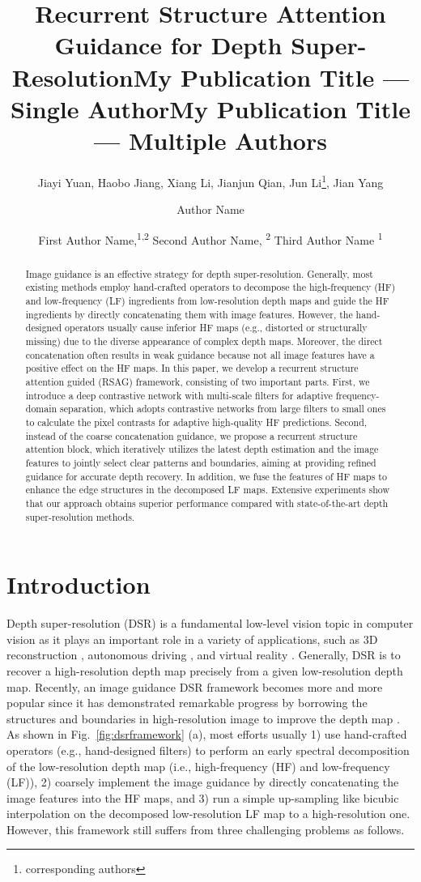 \documentclass[letterpaper]{article} %
\title{Recurrent Structure Attention Guidance for Depth Super-Resolution}
\author{
    Jiayi Yuan\equalcontrib, Haobo Jiang\equalcontrib, Xiang Li, Jianjun Qian\footnotemark[2], Jun Li\thanks{corresponding authors}, Jian Yang
}
\title{My Publication Title --- Single Author}
\author {
    Author Name
}
\title{My Publication Title --- Multiple Authors}
\author {
    First Author Name,\textsuperscript{\rm 1,\rm 2}
    Second Author Name, \textsuperscript{\rm 2}
    Third Author Name \textsuperscript{\rm 1}
}
\begin{document}
\maketitle

\begin{abstract}
Image guidance is an effective strategy for depth super-resolution. Generally, most existing methods employ hand-crafted operators to decompose the high-frequency (HF) and low-frequency (LF) ingredients from low-resolution depth maps and guide the HF ingredients by directly concatenating them with image features. However, the hand-designed operators usually cause inferior HF maps (e.g., distorted or structurally missing) due to the diverse appearance of complex depth maps. Moreover, the direct concatenation often results in weak guidance because not all image features have a positive effect on the HF maps. In this paper, we develop a recurrent structure attention guided (RSAG) framework, consisting of two important parts. First, we introduce a deep contrastive network with multi-scale filters for adaptive frequency-domain separation, which adopts contrastive networks from large filters to small ones to calculate the pixel contrasts for adaptive high-quality HF predictions. Second, instead of the coarse concatenation guidance, we propose a recurrent structure attention block, which iteratively utilizes the latest depth estimation and the image features to jointly select clear patterns and boundaries, aiming at providing refined guidance for accurate depth recovery. In addition, we fuse the features of HF maps to enhance the edge structures in the decomposed LF maps. Extensive experiments show that our approach obtains superior performance compared with state-of-the-art depth super-resolution methods.
\end{abstract}

\section{Introduction}

Depth super-resolution (DSR) is a fundamental low-level vision topic in computer vision as it plays an important role in a variety of applications, such as 3D reconstruction \cite{hou20193d}, autonomous driving \cite{caesar2020nuscenes}, and virtual reality \cite{meuleman2020single}. Generally, DSR is to recover a high-resolution depth map precisely from a given low-resolution depth map. Recently, an image guidance DSR framework becomes more and more popular since it has demonstrated remarkable progress by borrowing the structures and boundaries in high-resolution image to improve the depth map \cite{2016Multi}. As shown in Fig.~\ref{fig:dsrframework} (a), most efforts
\cite{2016Multi,2019Hierarchical,zuo2019multi,li2019joint} usually 1) use hand-crafted operators (e.g., hand-designed filters) to perform an early spectral decomposition of the low-resolution depth map (i.e., high-frequency (HF) and low-frequency (LF)), 2) coarsely implement the image guidance by directly concatenating the image features into the HF maps, and 3) run a simple up-sampling like bicubic interpolation on the decomposed low-resolution LF map to a high-resolution one. However, this framework still suffers from three challenging problems as follows.
\end{document}
